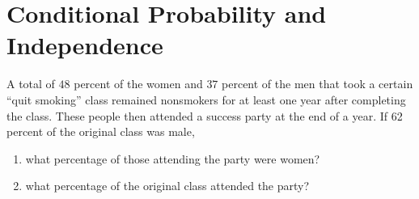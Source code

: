 \documentclass{article}[12pt]
\newenvironment{problem}[1]
  {\renewcommand\theinnercustomprblm{#1}\innercustomprblm}
  {\endinnercustomprblm}
\begin{document}
\section{Conditional Probability and Independence}

\begin{problem}{3.19}\normalfont
A total of $48$ percent of the women and $37$ percent of the men that took a certain “quit smoking” class remained nonsmokers for at least one year after completing the class. 
These people then attended a success party at the end of a year. 
If 62 percent of the original class was male,
\begin{enumerate}[label=(\alph*)]
    \item what percentage of those attending the party were women?
    \item what percentage of the original class attended the party?
\end{enumerate}
\end{problem}
\end{document}
